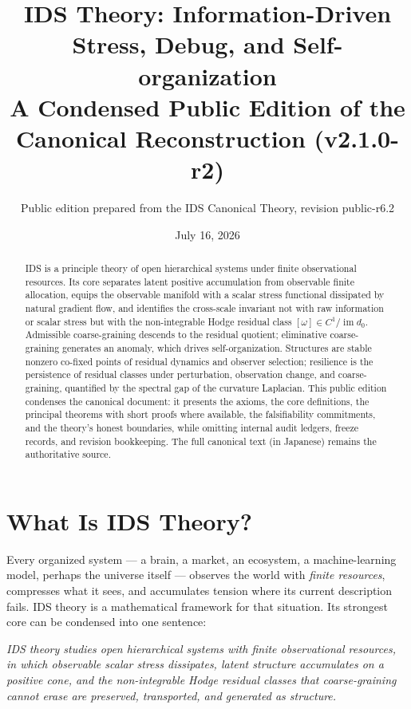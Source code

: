 \documentclass[11pt,a4paper]{article}
\title{\bfseries IDS Theory: Information-Driven Stress, Debug, and Self-organization\\[6pt]
\large A Condensed Public Edition of the Canonical Reconstruction (v2.1.0-r2)}
\author{\normalsize Public edition prepared from the IDS Canonical Theory, revision public-r6.2}
\date{July 16, 2026}
\newenvironment{canonbox}{\begin{mdframed}[style=canon]\itshape}{\end{mdframed}}
\theoremstyle{plain}
\begin{document}
\maketitle

\begin{abstract}
\noindent
IDS is a principle theory of open hierarchical systems under finite observational resources. Its core separates latent positive accumulation from observable finite allocation, equips the observable manifold with a scalar stress functional dissipated by natural gradient flow, and identifies the cross-scale invariant not with raw information or scalar stress but with the non-integrable Hodge residual class $[\omega]\in C^1/\operatorname{im}d_0$. Admissible coarse-graining descends to the residual quotient; eliminative coarse-graining generates an anomaly, which drives self-organization. Structures are stable nonzero co-fixed points of residual dynamics and observer selection; resilience is the persistence of residual classes under perturbation, observation change, and coarse-graining, quantified by the spectral gap of the curvature Laplacian. This public edition condenses the canonical document: it presents the axioms, the core definitions, the principal theorems with short proofs where available, the falsifiability commitments, and the theory's honest boundaries, while omitting internal audit ledgers, freeze records, and revision bookkeeping. The full canonical text (in Japanese) remains the authoritative source.
\end{abstract}

\medskip
\tableofcontents

\section{What Is IDS Theory?}\label{sec:intro}

Every organized system --- a brain, a market, an ecosystem, a machine-learning model, perhaps the universe itself --- observes the world with \emph{finite resources}, compresses what it sees, and accumulates tension where its current description fails. IDS theory is a mathematical framework for that situation. Its strongest core can be condensed into one sentence:

\begin{canonbox}
IDS theory studies open hierarchical systems with finite observational resources, in which observable scalar stress dissipates, latent structure accumulates on a positive cone, and the non-integrable Hodge residual classes that coarse-graining cannot erase are preserved, transported, and generated as structure.
\end{canonbox}
\end{document}
